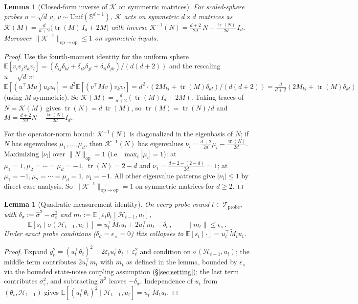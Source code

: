 \documentclass{article}
\newcommand{\E}{\mathbb{E}}
\newcommand{\op}{\mathrm{op}}
\newcommand{\cH}{\mathcal{H}}
\newcommand{\cTprobe}{\mathcal{T}_{\mathrm{probe}}}
\DeclareMathOperator{\tr}{tr}
\newtheorem{lemma}[theorem]{Lemma}
\begin{document}
\begin{lemma}[Closed-form inverse of $\mathcal K$ on symmetric matrices]
\label{lem:K_inverse}
For scaled-sphere probes $u=\sqrt d\,v$, $v\sim\mathrm{Unif}(\mathbb S^{d-1})$,
$\mathcal K$ acts on symmetric $d\times d$ matrices as
$\mathcal K(M) = \tfrac{d}{d+2}\bigl(\tr(M)\,I_d + 2M\bigr)$ with inverse
$\mathcal K^{-1}(N) = \tfrac{d+2}{2d}\,N - \tfrac{\tr(N)}{2d}\,I_d$.
Moreover $\|\mathcal K^{-1}\|_{\op\to\op}\le 1$ on symmetric inputs.
\end{lemma}
\begin{proof}
Use the fourth-moment identity for the uniform sphere
$\E[v_iv_jv_kv_l] = (\delta_{ij}\delta_{kl}+\delta_{ik}\delta_{jl}+\delta_{il}\delta_{jk})/(d(d+2))$
and the rescaling $u=\sqrt d\,v$:
$\E[(u^\top M u)u_ku_l] = d^2 \E[(v^\top Mv)v_kv_l]
= d^2\cdot(2 M_{kl} + \tr(M)\delta_{kl})/(d(d+2))
= \tfrac{d}{d+2}(2M_{kl}+\tr(M)\delta_{kl})$
(using $M$ symmetric). So
$\mathcal K(M) = \tfrac{d}{d+2}(\tr(M)I_d + 2M)$. Taking traces of
$N=\mathcal K(M)$ gives $\tr(N) = d\,\tr(M)$, so
$\tr(M)=\tr(N)/d$ and
$M = \tfrac{d+2}{2d}N - \tfrac{\tr(N)}{2d}I_d$.

For the operator-norm bound: $\mathcal K^{-1}(N)$ is diagonalized in
the eigenbasis of $N$; if $N$ has eigenvalues $\mu_1,\dots,\mu_d$,
then $\mathcal K^{-1}(N)$ has eigenvalues
$\nu_i = \tfrac{d+2}{2d}\mu_i - \tfrac{\tr(N)}{2d}$. Maximizing
$|\nu_i|$ over $\|N\|_\op = 1$ (i.e.\ $\max_i|\mu_i|=1$): at
$\mu_1=1,\mu_2=\cdots=\mu_d=-1$, $\tr(N)=2-d$ and
$\nu_1 = \tfrac{d+2-(2-d)}{2d} = 1$; at $\mu_1=-1,\mu_2=\cdots=\mu_d=1$,
$\nu_1 = -1$. All other eigenvalue patterns give $|\nu_i|\le 1$ by
direct case analysis. So $\|\mathcal K^{-1}\|_{\op\to\op} = 1$ on
symmetric matrices for $d\ge 2$.
\end{proof}

\begin{lemma}[Quadratic measurement identity]
\label{lem:quad_conf}
On every probe round $t\in\cTprobe$, with
$\delta_\sigma := \widehat\sigma^2 - \sigma_\varepsilon^2$ and
$m_t := \E[\varepsilon_t\theta_t\mid\cH_{t-1},u_t]$,
\[
\E[s_t\mid\sigma(\cH_{t-1},u_t)]
= u_t^\top \widetilde M_t u_t + 2 u_t^\top m_t
- \delta_\sigma,\qquad \|m_t\|\le\epsilon_\times.
\]
Under exact probe conditions ($\delta_\sigma=\epsilon_\times=0$) this
collapses to $\E[s_t\mid\cdot] = u_t^\top\widetilde M_t u_t$.
\end{lemma}
\begin{proof}
Expand $y_t^2 = (u_t^\top\theta_t)^2 + 2\varepsilon_t u_t^\top\theta_t
+ \varepsilon_t^2$ and condition on $\sigma(\cH_{t-1},u_t)$; the middle
term contributes $2u_t^\top m_t$ with $m_t$ as defined in the lemma,
bounded by $\epsilon_\times$ via the bounded state-noise coupling
assumption (\S\ref{sec:setting}); the last term contributes
$\sigma_\varepsilon^2$, and subtracting $\widehat\sigma^2$ leaves
$-\delta_\sigma$. Independence of $u_t$ from $(\theta_t,\cH_{t-1})$
gives $\E[(u_t^\top\theta_t)^2\mid\cH_{t-1},u_t] = u_t^\top\widetilde M_t u_t$.
\end{proof}
\end{document}
